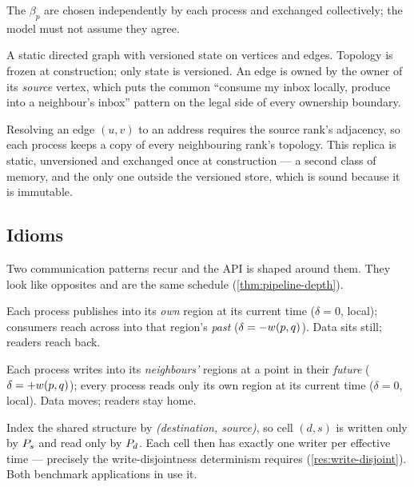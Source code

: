 The $\beta_p$ are chosen independently by each process and exchanged
collectively; the model must not assume they agree.

A static directed graph with versioned state on vertices and edges. Topology
is frozen at construction; only state is versioned. An edge is owned by the
owner of its \emph{source} vertex, which puts the common ``consume my inbox
locally, produce into a neighbour's inbox'' pattern on the legal side of every
ownership boundary.

Resolving an edge $(u,v)$ to an address requires the source rank's adjacency,
so each process keeps a copy of every neighbouring rank's topology. This
replica is static, unversioned and exchanged once at construction --- a second
class of memory, and the only one outside the versioned store, which is sound
because it is immutable.

\subsection{Idioms}
\label{sec:gloss-idioms}

Two communication patterns recur and the API is shaped around them. They look
like opposites and are the same schedule (\cref{thm:pipeline-depth}).

Each process publishes into its \emph{own} region at its current time
($\delta = 0$, local); consumers reach across into that region's \emph{past}
($\delta = -w(p,q)$). Data sits still; readers reach back.

Each process writes into its \emph{neighbours'} regions at a point in their
\emph{future} ($\delta = +w(p,q)$); every process reads only its own
region at its current time ($\delta = 0$, local). Data moves; readers stay
home.

Index the shared structure by \emph{(destination, source)}, so cell $(d,s)$ is
written only by $P_{s}$ and read only by $P_{d}$. Each cell then has
exactly one writer per effective time --- precisely the write-disjointness
determinism requires (\cref{res:write-disjoint}). Both benchmark applications
in \cite{dstm2026} use it.
